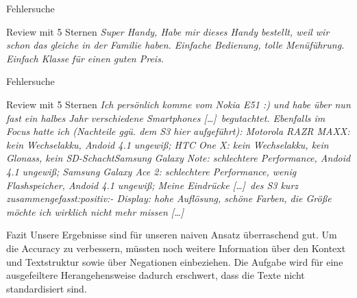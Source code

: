 \documentclass[note=hide]{beamer} %
\newcommand{\ellipse}{[\ldots]}
\begin{document}
\begin{frame}{Fehlersuche}
	\begin{block}{Review mit 5 Sternen}
		\it
		Super Handy, Habe mir dieses Handy bestellt, weil wir schon das gleiche in der Familie haben. Einfache Bedienung, tolle Menüführung. Einfach Klasse für einen guten Preis.
	\end{block}
\end{frame}

\begin{frame}{Fehlersuche}
	\begin{block}{Review mit 5 Sternen}
		\it
	Ich persönlich komme vom Nokia E51 :) und habe über nun fast ein halbes Jahr verschiedene Smartphones \ellipse\ begutachtet. Ebenfalls im Focus hatte ich (Nachteile ggü. dem S3 hier aufgeführt): Motorola RAZR MAXX: kein Wechselakku, Andoid 4.1 ungewiß; HTC One X: kein Wechselakku, kein Glonass, kein SD-SchachtSamsung Galaxy Note: schlechtere Performance, Andoid 4.1 ungewiß; Samsung Galaxy Ace 2: schlechtere Performance, wenig Flashspeicher, Andoid 4.1 ungewiß; Meine Eindrücke \ellipse\ des S3 kurz zusammengefasst:positiv:- Display: hohe Auflösung, schöne Farben, die Größe möchte ich wirklich nicht mehr missen \ellipse
	\end{block}
\end{frame}

\begin{frame}{Fazit}
	Unsere Ergebnisse sind für unseren naiven Ansatz überraschend gut.
	Um die Accuracy zu verbessern, müssten noch weitere Information über den Kontext und Textstruktur sowie über Negationen einbeziehen.
	Die Aufgabe wird für eine ausgefeiltere Herangehensweise dadurch erschwert, dass die Texte nicht standardisiert sind.
\end{frame}
\end{document}
